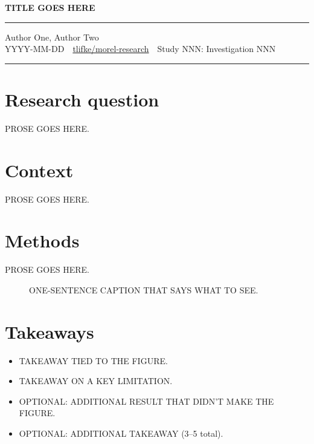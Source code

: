 \documentclass[10pt]{article}
\begin{document}
\begin{center}
{\Large\bfseries TITLE GOES HERE\par}
\end{center}
\vspace{0.2em}
\hrule
\vspace{0.4em}
\begin{center}
Author One, Author Two\\[0.15em]
{\small YYYY-MM-DD \,\textbullet\, \href{https://github.com/tlifke/morel-research}{tlifke/morel-research} \,\textbullet\, Study NNN: Investigation NNN}
\end{center}
\vspace{0.2em}
\hrule
\vspace{0.8em}

\section*{Research question}
PROSE GOES HERE.

\section*{Context}
PROSE GOES HERE.

\section*{Methods}
PROSE GOES HERE.

\begin{figure}[h]
  \centering
  \caption{ONE-SENTENCE CAPTION THAT SAYS WHAT TO SEE.}
\end{figure}

\section*{Takeaways}
\begin{itemize}
  \item TAKEAWAY TIED TO THE FIGURE.
  \item TAKEAWAY ON A KEY LIMITATION.
  \item OPTIONAL: ADDITIONAL RESULT THAT DIDN'T MAKE THE FIGURE.
  \item OPTIONAL: ADDITIONAL TAKEAWAY (3--5 total).
\end{itemize}
\end{document}
